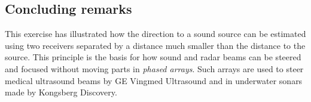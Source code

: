 \subsection*{Concluding remarks}
This exercise has illustrated how the direction to a sound source can be estimated using two receivers separated by a distance much smaller than the distance to the source.
This principle is the basis for how sound and radar beams can be steered and focused without moving parts in \emph{phased arrays}. Such arrays are used to steer medical ultrasound beams by GE Vingmed Ultrasound and in underwater sonars made by Kongsberg Discovery.




